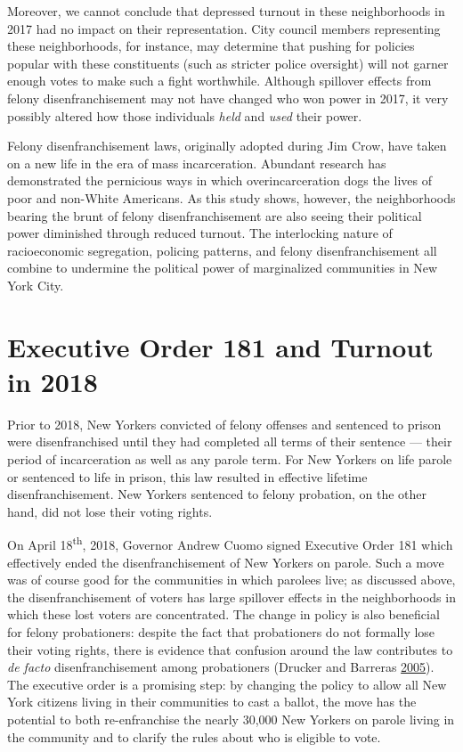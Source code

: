 \documentclass[
  12pt,
]{article}
\begin{document}
Moreover, we cannot conclude that depressed turnout in these neighborhoods in 2017 had no impact on their representation. City council members representing these neighborhoods, for instance, may determine that pushing for policies popular with these constituents (such as stricter police oversight) will not garner enough votes to make such a fight worthwhile. Although spillover effects from felony disenfranchisement may not have changed who won power in 2017, it very possibly altered how those individuals \emph{held} and \emph{used} their power.

Felony disenfranchisement laws, originally adopted during Jim Crow, have taken on a new life in the era of mass incarceration. Abundant research has demonstrated the pernicious ways in which overincarceration dogs the lives of poor and non-White Americans. As this study shows, however, the neighborhoods bearing the brunt of felony disenfranchisement are also seeing their political power diminished through reduced turnout. The interlocking nature of racioeconomic segregation, policing patterns, and felony disenfranchisement all combine to undermine the political power of marginalized communities in New York City.

\pagebreak

\hypertarget{executive-order-181-and-turnout-in-2018}{%
\section{Executive Order 181 and Turnout in 2018}\label{executive-order-181-and-turnout-in-2018}}

Prior to 2018, New Yorkers convicted of felony offenses and sentenced to prison were disenfranchised until they had completed all terms of their sentence --- their period of incarceration as well as any parole term. For New Yorkers on life parole or sentenced to life in prison, this law resulted in effective lifetime disenfranchisement. New Yorkers sentenced to felony probation, on the other hand, did not lose their voting rights.

On April 18\textsuperscript{th}, 2018, Governor Andrew Cuomo signed Executive Order 181 which effectively ended the disenfranchisement of New Yorkers on parole. Such a move was of course good for the communities in which parolees live; as discussed above, the disenfranchisement of voters has large spillover effects in the neighborhoods in which these lost voters are concentrated. The change in policy is also beneficial for felony probationers: despite the fact that probationers do not formally lose their voting rights, there is evidence that confusion around the law contributes to \emph{de facto} disenfranchisement among probationers (Drucker and Barreras \protect\hyperlink{ref-Drucker2005}{2005}). The executive order is a promising step: by changing the policy to allow all New York citizens living in their communities to cast a ballot, the move has the potential to both re-enfranchise the nearly 30,000 New Yorkers on parole living in the community and to clarify the rules about who is eligible to vote.
\end{document}
